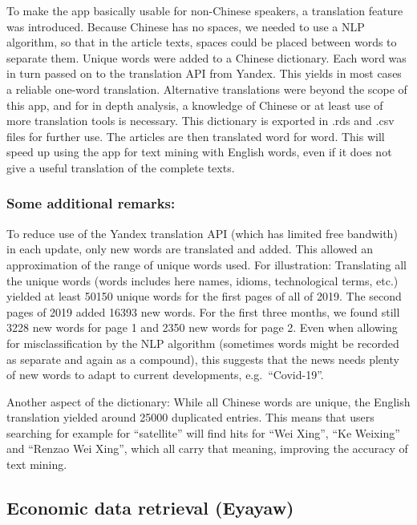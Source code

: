 \documentclass[12pt,a4paper]{article}
\begin{document}
To make the app basically usable for non-Chinese speakers, a translation feature was introduced. Because Chinese has no spaces, we needed to use a NLP algorithm, so that in the article texts, spaces could be placed between words to separate them. Unique words were added to a Chinese dictionary. Each word was in turn passed on to the translation API from Yandex. This yields in most cases a reliable one-word translation. Alternative translations were beyond the scope of this app, and for in depth analysis, a knowledge of Chinese or at least use of more translation tools is necessary. This dictionary is exported in .rds and .csv files for further use. The articles are then translated word for word. This will speed up using the app for text mining with English words, even if it does not give a useful translation of the complete texts.

\hypertarget{some-additional-remarks}{%
\subsubsection{Some additional remarks:}\label{some-additional-remarks}}

To reduce use of the Yandex translation API (which has limited free bandwith) in each update, only new words are translated and added. This allowed an approximation of the range of unique words used. For illustration: Translating all the unique words (words includes here names, idioms, technological terms, etc.) yielded at least 50150 unique words for the first pages of all of 2019. The second pages of 2019 added 16393 new words. For the first three months, we found still 3228 new words for page 1 and 2350 new words for page 2. Even when allowing for misclassification by the NLP algorithm (sometimes words might be recorded as separate and again as a compound), this suggests that the news needs plenty of new words to adapt to current developments, e.g.~``Covid-19''.

Another aspect of the dictionary: While all Chinese words are unique, the English translation yielded around 25000 duplicated entries. This means that users searching for example for ``satellite'' will find hits for ``Wei Xing'', ``Ke Weixing'' and ``Renzao Wei Xing'', which all carry that meaning, improving the accuracy of text mining.

\hypertarget{economic-data-retrieval-eyayaw}{%
\subsection{Economic data retrieval (Eyayaw)}\label{economic-data-retrieval-eyayaw}}
\end{document}
